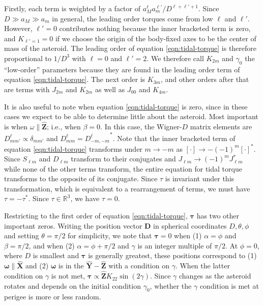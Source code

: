\documentclass{aastex631}
\newcommand{\unit}[1]{\hat{\bm{#1}}}
\begin{document}
Firstly, each term is weighted by a factor of $a_M^\ell a_m^{\ell'}/D^{\ell+\ell'+1}$. Since $D \gg a_M \gg a_m$ in general, the leading order torques come from low $\ell$ and $\ell'$. However, $\ell'=0$ contributes nothing because the inner bracketed term is zero, and $K_{\ell' = 1} = 0$ if we choose the origin of the body-fixed axes to be the center of mass of the asteroid. The leading order of equation \ref{eqn:tidal-torque} is therefore proportional to $1/D^3$ with $\ell = 0$ and $\ell' = 2$. We therefore call $K_{2m}$ and $\gamma_0$ the ``low-order'' parameters because they are found in the leading order term of equation \ref{eqn:tidal-torque}. The next order is $K_{3m}$, and other orders after that are terms with $J_{2m}$ and $K_{2m}$ as well as $J_{00}$ and $K_{4m}$.


It is also useful to note when equation \ref{eqn:tidal-torque} is zero, since in these cases we expect to be able to determine little about the asteroid. Most important is when $\omega \parallel \unit Z$; i.e., when $\beta=0$. In this case, the Wigner-$D$ matrix elements are $D^\ell_{m m'} \propto \delta_{m m'}$ and $D^\ell_{mm}={D^\ell_{-m,-m}}^*$. Note that the inner bracketed term of equation \ref{eqn:tidal-torque} transforms under $m \rightarrow -m$ as $[\cdot ] \rightarrow -(-1)^m[\cdot]^*$. Since $S_{\ell m}$ and $D_{\ell m}$ transform to their conjugates and $J_{\ell m} \rightarrow (-1)^m J_{\ell m}^*$ while none of the other terms transform, the entire equation for tidal torque transforms to the opposite of its conjugate. Since $\tau$ is invariant under this transformation, which is equivalent to a rearrangement of terms, we must have $\tau = -\tau^*$. Since $\tau \in \mathds{R}^3$, we have $\tau = 0$. 

Restricting to the first order of equation \ref{eqn:tidal-torque}, $\bm \tau$ has two other important zeros. Writing the position vector $\bm D$ in spherical coordinates $D, \theta, \phi$ and setting $\theta = \pi/2$ for simplicity, we note that $\bm \tau = 0$ when (1) $\alpha=\phi$ and $\beta = \pi/2$, and when (2) $\alpha=\phi+\pi/2$ and $\gamma$ is an integer multiple of $\pi/2$. At $\phi=0$, where $D$ is smallest and $\bm \tau$ is generally greatest, these positions correspond to (1) $\bm \omega \parallel \unit X$ and (2) $\bm \omega$ is in the $\unit Y-\unit Z$ with a condition on $\gamma$. When the latter condition on $\gamma$ is not met, $\bm \tau \propto \unit Z K_{22} \sin(2\gamma)$. Since $\gamma$ changes as the asteroid rotates and depends on the initial condition $\gamma_0$, whether the $\gamma$ condition is met at perigee is more or less random.
\end{document}
